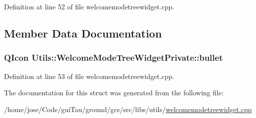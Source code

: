 Definition at line 52 of file welcomemodetreewidget.\-cpp.



\subsection{Member Data Documentation}
\hypertarget{struct_utils_1_1_welcome_mode_tree_widget_private_aea53f4bcde16dee437ac370f27766cc6}{
\subsubsection[{bullet}]{\setlength{\rightskip}{0pt plus 5cm}Q\-Icon Utils\-::\-Welcome\-Mode\-Tree\-Widget\-Private\-::bullet}}\label{struct_utils_1_1_welcome_mode_tree_widget_private_aea53f4bcde16dee437ac370f27766cc6}


Definition at line 53 of file welcomemodetreewidget.\-cpp.



The documentation for this struct was generated from the following file\-:\begin{DoxyCompactItemize}
\item 
/home/jose/\-Code/gui\-Tau/ground/gcs/src/libs/utils/\hyperlink{welcomemodetreewidget_8cpp}{welcomemodetreewidget.\-cpp}\end{DoxyCompactItemize}

